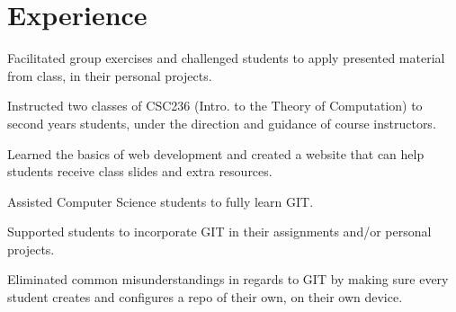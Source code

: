 \documentclass[]{dans-resume}
\begin{document}
\hfill
\begin{minipage}[t]{0.66\textwidth}

\section{Experience}

\vspace{\topsep} %
\begin{tightemize}
\item Facilitated group exercises and challenged students to apply presented material from class,
in their personal projects.
\item Instructed two classes of CSC236 (Intro. to the Theory of
Computation) to second years students, under the direction and guidance of course instructors.
\item Learned the basics of web development and created a website that can help students
receive class slides and extra resources.
\end{tightemize}




\begin{tightemize}
\item Assisted Computer Science students to fully learn GIT.
\item Supported students to incorporate GIT in their assignments
and/or personal projects.
\item Eliminated common misunderstandings in regards to GIT by making sure every student
creates and configures a repo of their own, on their own device.
\end{tightemize}



\end{minipage}
\end{document}
